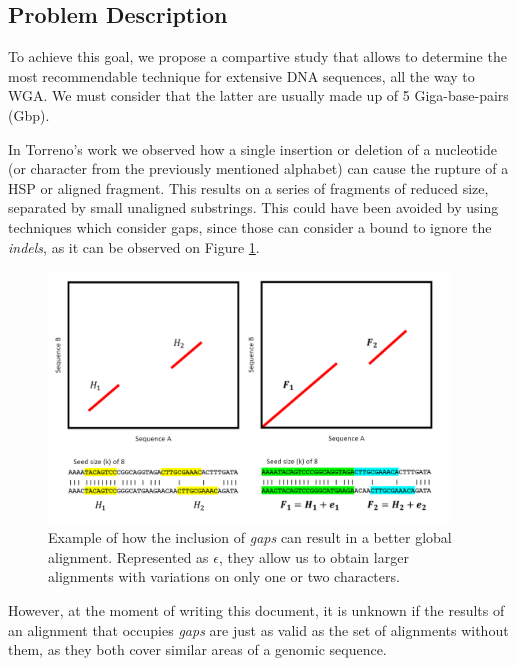 \subsection{Problem Description}

To achieve this goal, we propose a compartive study that allows to determine the most recommendable technique for extensive DNA sequences, all the way to WGA. We must consider that the latter are usually made up of 5 Giga-base-pairs (Gbp).

\medskip

In Torreno's work \cite{Tirado2015BreakingTC} we observed how a single insertion or deletion of a nucleotide (or character from the previously mentioned alphabet) can cause the rupture of a HSP or aligned fragment. This results on a series of fragments of reduced size, separated by small unaligned substrings. This could have been avoided by using techniques which consider gaps, since those can consider a bound to ignore the \textit{indels}, as it can be observed on Figure \ref{fragmentImprovement}.

\begin{figure}
  \centering
  \includegraphics[width=0.95\textwidth]{images/fragmentImprovement.png}
  \caption[]{Example of how the inclusion of \textit{gaps} can result in a better global alignment. Represented as $\epsilon$, they allow us to obtain larger alignments with variations on only one or two characters.}
  \label{fragmentImprovement}
\end{figure}

\medskip

However, at the moment of writing this document, it is unknown if the results of an alignment that occupies \textit{gaps} are just as valid as the set of alignments without them, as they both cover similar areas of a genomic sequence. 

